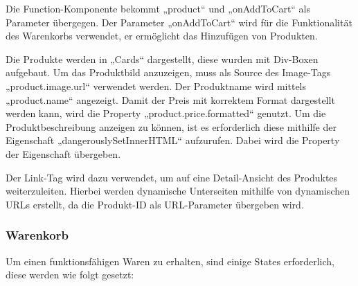 Die Function-Komponente bekommt „product“ und „onAddToCart“ als Parameter übergegen. Der Parameter „onAddToCart“ wird für die Funktionalität des Warenkorbs verwendet, er ermöglicht das Hinzufügen von Produkten.

Die Produkte werden in „Cards“ dargestellt, diese wurden mit Div-Boxen aufgebaut. Um das Produktbild anzuzeigen, muss als Source des Image-Tags „{product.image.url}“ verwendet werden. Der Produktname wird mittels „{product.name}“ angezeigt.  Damit der Preis mit korrektem Format dargestellt werden kann, wird die Property „{product.price.formatted}“ genutzt. Um die Produktbeschreibung anzeigen zu können, ist es erforderlich diese mithilfe der Eigenschaft „dangerouslySetInnerHTML“ aufzurufen. Dabei wird die Property der Eigenschaft übergeben.

Der Link-Tag wird dazu verwendet, um auf eine Detail-Ansicht des Produktes weiterzuleiten. Hierbei werden dynamische Unterseiten mithilfe von dynamischen URLs erstellt, da die Produkt-ID als URL-Parameter übergeben wird.

\subsubsection{Warenkorb}
Um einen funktionsfähigen Waren zu erhalten, sind einige States erforderlich, diese werden wie folgt gesetzt:


